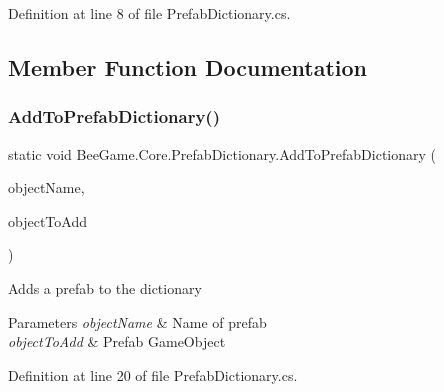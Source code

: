 Definition at line 8 of file Prefab\+Dictionary.\+cs.



\subsection{Member Function Documentation}
\mbox{\label{class_bee_game_1_1_core_1_1_prefab_dictionary_a71a5cfc3c0e9ec6d630b2aac96615108}} 
\subsubsection{\texorpdfstring{Add\+To\+Prefab\+Dictionary()}{AddToPrefabDictionary()}}
{\footnotesize\ttfamily static void Bee\+Game.\+Core.\+Prefab\+Dictionary.\+Add\+To\+Prefab\+Dictionary (\begin{DoxyParamCaption}\item[{string}]{object\+Name,  }\item[{Game\+Object}]{object\+To\+Add }\end{DoxyParamCaption})\hspace{0.3cm}{\ttfamily [static]}}



Adds a prefab to the dictionary 


\begin{DoxyParams}{Parameters}
{\em object\+Name} & Name of prefab\\
\hline
{\em object\+To\+Add} & Prefab Game\+Object\\
\hline
\end{DoxyParams}


Definition at line 20 of file Prefab\+Dictionary.\+cs.


